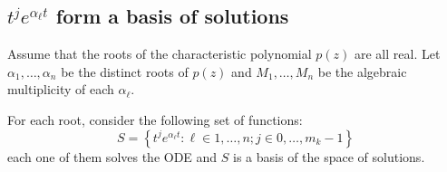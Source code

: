 \documentclass[12pt]{extarticle}
\numberwithin{equation}{section}
\begin{document}
\subsection{\texorpdfstring{$t^j e^{\alpha_\ell t}$ form a basis of solutions}{Basis of solutions}}

\begin{theorem}{}{}
    Assume that the roots of the characteristic polynomial $p(z)$ are all real.
    Let $\alpha_1, \dots, \alpha_n$ be the distinct roots of $p(z)$ and
    $M_1, \dots, M_n$ be the algebraic multiplicity of each $\alpha_\ell$.

    For each root, consider the following set of functions:
    \begin{equation}
        S = \left\{ t^j e^{\alpha_\ell t} : \ell \in 1, \dots, n; j \in 0, \dots, m_k -1 \right\}
    \end{equation}
    each one of them solves the ODE and $S$ is a basis of the space of solutions.
\end{theorem}
\end{document}
